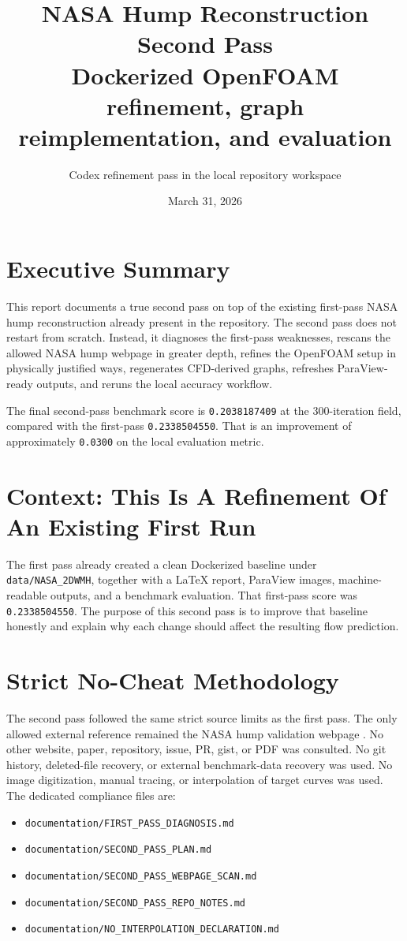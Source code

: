 \documentclass[11pt]{article}
\title{NASA Hump Reconstruction Second Pass\\\large Dockerized OpenFOAM refinement, graph reimplementation, and evaluation}
\author{Codex refinement pass in the local repository workspace}
\date{March 31, 2026}
\begin{document}
\maketitle

\section{Executive Summary}
This report documents a true second pass on top of the existing first-pass NASA hump reconstruction already present in the repository. The second pass does not restart from scratch. Instead, it diagnoses the first-pass weaknesses, rescans the allowed NASA hump webpage in greater depth, refines the OpenFOAM setup in physically justified ways, regenerates CFD-derived graphs, refreshes ParaView-ready outputs, and reruns the local accuracy workflow.

The final second-pass benchmark score is \texttt{0.2038187409} at the 300-iteration field, compared with the first-pass \texttt{0.2338504550}. That is an improvement of approximately \texttt{0.0300} on the local evaluation metric.

\section{Context: This Is A Refinement Of An Existing First Run}
The first pass already created a clean Dockerized baseline under \texttt{data/NASA\_2DWMH}, together with a LaTeX report, ParaView images, machine-readable outputs, and a benchmark evaluation. That first-pass score was \texttt{0.2338504550}. The purpose of this second pass is to improve that baseline honestly and explain why each change should affect the resulting flow prediction.

\section{Strict No-Cheat Methodology}
The second pass followed the same strict source limits as the first pass. The only allowed external reference remained the NASA hump validation webpage \cite{nasahump}. No other website, paper, repository, issue, PR, gist, or PDF was consulted. No git history, deleted-file recovery, or external benchmark-data recovery was used. No image digitization, manual tracing, or interpolation of target curves was used. The dedicated compliance files are:
\begin{itemize}
\item \texttt{documentation/FIRST\_PASS\_DIAGNOSIS.md}
\item \texttt{documentation/SECOND\_PASS\_PLAN.md}
\item \texttt{documentation/SECOND\_PASS\_WEBPAGE\_SCAN.md}
\item \texttt{documentation/SECOND\_PASS\_REPO\_NOTES.md}
\item \texttt{documentation/NO\_INTERPOLATION\_DECLARATION.md}
\end{itemize}
\end{document}
